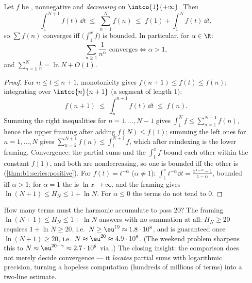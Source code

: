 \begin{theorem}\label{thm:b1:series:riemann}
Let $f$ be , nonnegative and \emph{decreasing} on
$\intco{1}{+\infty}$. Then
\[
\int_1^{N+1} f(t)\,\dd t \;\leq\; \sum_{n=1}^{N} f(n) \;\leq\; f(1)
+ \int_1^{N} f(t)\,\dd t ,
\]
so $\sum f(n)$ converges iff $\bigl(\int_1^x f\bigr)$ is bounded. In
particular, for $\alpha \in \R$:
\[
\sum_{n \geq 1} \frac{1}{n^\alpha} \text{ converges}
\iff \alpha > 1,
\]
and $\sum_{n=1}^{N} \frac1n = \ln N + O(1)$.
\end{theorem}

\begin{proof}
For $n \leq t \leq n+1$, monotonicity gives $f(n+1) \leq f(t)
\leq f(n)$; integrating over $\intcc{n}{n+1}$ (a segment of
length $1$):
\[
f(n+1) \;\leq\; \int_n^{n+1} f(t)\,\dd t \;\leq\; f(n) .
\]
Summing the right inequalities for $n = 1, \dots, N-1$ gives
$\int_1^{N} f \leq \sum_{n=1}^{N-1} f(n)$, hence the upper
framing after adding $f(N) \leq f(1)$; summing the left ones for
$n = 1, \dots, N$ gives $\sum_{n=2}^{N+1} f(n) \leq
\int_1^{N+1} f$, which after reindexing is the lower framing.
Convergence: the partial sums and the  $\int_1^x f$
bound each other within the constant $f(1)$, and both are
nondecreasing, so one is bounded iff the other is
(\cref{thm:b1:series:positive}). For $f(t)
= t^{-\alpha}$ ($\alpha \neq 1$): $\int_1^x t^{-\alpha}\dd t =
\frac{x^{1-\alpha} - 1}{1 - \alpha}$, bounded iff $\alpha > 1$; for
$\alpha = 1$ the  is $\ln x \to \infty$, and the framing
gives $\ln(N+1) \leq H_N \leq 1 + \ln N$. For $\alpha \leq 0$ the
terms do not tend to $0$.
\end{proof}

\begin{example}\label{ex:b1:series:harmonicstack}
How many terms must the harmonic  accumulate to pass $20$?
The framing $\ln(N+1) \leq H_N \leq 1 + \ln N$ answers with no
summation at all: $H_N \geq 20$ requires $1 + \ln N \geq 20$,
i.e.\ $N \geq \eu^{19} \approx 1.8\cdot10^{8}$, and is guaranteed
once $\ln(N + 1) \geq 20$, i.e.\ $N \approx \eu^{20} \approx
4.9\cdot10^{8}$. (The weekend problem sharpens this to $N \approx
\eu^{20 - \gamma} \approx 2.7\cdot10^{8}$ via .)
The closing insight: the  comparison does not merely
decide convergence --- it \emph{locates} partial sums with
logarithmic precision, turning a hopeless computation
(hundreds of millions of terms) into a two-line estimate.
\end{example}

